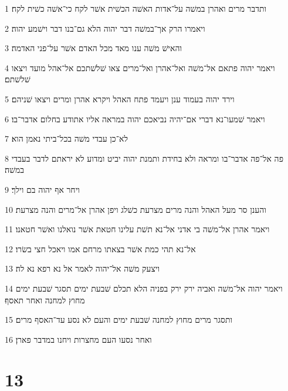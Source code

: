 \par 1 ותדבר מרים ואהרן במשׁה על־אדות האשׁה הכשׁית אשׁר לקח כי־אשׁה כשׁית לקח׃
\par 2 ויאמרו הרק אך־במשׁה דבר יהוה הלא גם־בנו דבר וישׁמע יהוה׃
\par 3 והאישׁ משׁה ענו מאד מכל האדם אשׁר על־פני האדמה׃
\par 4 ויאמר יהוה פתאם אל־משׁה ואל־אהרן ואל־מרים צאו שׁלשׁתכם אל־אהל מועד ויצאו שׁלשׁתם׃
\par 5 וירד יהוה בעמוד ענן ויעמד פתח האהל ויקרא אהרן ומרים ויצאו שׁניהם׃
\par 6 ויאמר שׁמעו־נא דברי אם־יהיה נביאכם יהוה במראה אליו אתודע בחלום אדבר־בו׃
\par 7 לא־כן עבדי משׁה בכל־ביתי נאמן הוא׃
\par 8 פה אל־פה אדבר־בו ומראה ולא בחידת ותמנת יהוה יביט ומדוע לא יראתם לדבר בעבדי במשׁה׃
\par 9 ויחר אף יהוה בם וילך׃
\par 10 והענן סר מעל האהל והנה מרים מצרעת כשׁלג ויפן אהרן אל־מרים והנה מצרעת׃
\par 11 ויאמר אהרן אל־משׁה בי אדני אל־נא תשׁת עלינו חטאת אשׁר נואלנו ואשׁר חטאנו׃
\par 12 אל־נא תהי כמת אשׁר בצאתו מרחם אמו ויאכל חצי בשׂרו׃
\par 13 ויצעק משׁה אל־יהוה לאמר אל נא רפא נא לה׃
\par 14 ויאמר יהוה אל־משׁה ואביה ירק ירק בפניה הלא תכלם שׁבעת ימים תסגר שׁבעת ימים מחוץ למחנה ואחר תאסף׃
\par 15 ותסגר מרים מחוץ למחנה שׁבעת ימים והעם לא נסע עד־האסף מרים׃
\par 16 ואחר נסעו העם מחצרות ויחנו במדבר פארן׃

\chapter{13}

